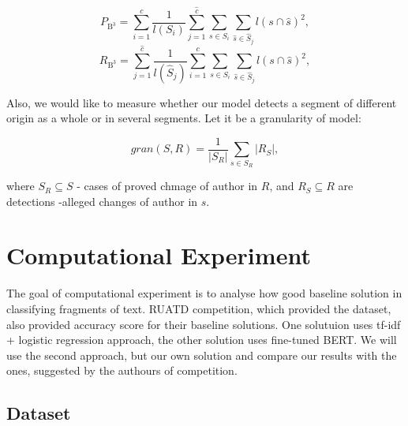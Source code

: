\documentclass{article}
\begin{document}
 $$ P_{\mathrm{B}^3} = \sum_{i=1}^c \frac{1}{l(S_i)}\sum_{j=1}^{\hat{c}}
	\sum_{s\in S_i}	\sum_{\hat{s}\in\hat{S}_j} l(s\cap \hat{s})^2, $$
$$ R_{\mathrm{B}^3} = \sum_{j=1}^{\hat{c}} \frac{1}{l(\hat{S}_j)}\sum_{i=1}^{c}
	\sum_{s\in S_i}	\sum_{\hat{s}\in\hat{S}_j} l(s\cap \hat{s})^2, $$

Also, we would like to measure whether our model detects a segment of different origin as a whole or in several segments. Let it be a granularity\cite{granularity} of model:

$$gran(S, R) = \frac{1}{|S_{R}|}\sum_{s \in S_{R}}|R_{S}|,$$

where $S_{R} \subseteq S$ - cases of proved chmage of author in $R$, and $R_{S} \subseteq R$ are detections -alleged changes of author in $s$.

\section{Computational Experiment}

The goal of computational experiment is to analyse how good baseline solution in classifying fragments of text. RUATD  competition, which provided the dataset, also provided accuracy score for their baseline solutions. One solutuion uses tf-idf + logistic regression approach, the other solution uses fine-tuned BERT. We will use the second approach, but our own solution and compare our results with the ones, suggested by the authours of competition.


\subsection{Dataset}
\end{document}
